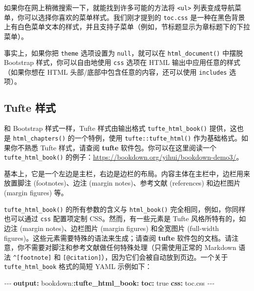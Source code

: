 \documentclass[
  12pt,
]{krantz}
\newenvironment{Shaded}{\begin{snugshade}}{\end{snugshade}}
\newcommand{\AttributeTok}[1]{\textcolor[rgb]{0.13,0.29,0.53}{#1}}
\newcommand{\CharTok}[1]{\textcolor[rgb]{0.31,0.60,0.02}{#1}}
\newcommand{\FunctionTok}[1]{\textcolor[rgb]{0.13,0.29,0.53}{\textbf{#1}}}
\newcommand{\KeywordTok}[1]{\textcolor[rgb]{0.13,0.29,0.53}{\textbf{#1}}}
\newcommand{\PreprocessorTok}[1]{\textcolor[rgb]{0.56,0.35,0.01}{\textit{#1}}}
\theoremstyle{definition}
\theoremstyle{definition}
\theoremstyle{definition}
\theoremstyle{definition}
\theoremstyle{remark}
\begin{document}
如果你在网上稍微搜索一下，就能找到许多可能的方法将 \texttt{\textless{}ul\textgreater{}} 列表变成导航菜单，你可以选择你喜欢的菜单样式。我们刚才提到的 \texttt{toc.css} 是一种在黑色背景上有白色菜单文本的样式，并且支持子菜单（例如，节标题显示为章标题下的下拉菜单）。

事实上，如果你把 \texttt{theme} 选项设置为 \texttt{null}，就可以在 \texttt{html\_document()} 中摆脱 Bootstrap 样式，你可以自由地使用 \texttt{css} 选项在 HTML 输出中应用任意的样式（如果你想在 HTML 头部/底部中包含任意的内容，还可以使用 \texttt{includes} 选项）。

\hypertarget{tufte-style}{%
\subsection{Tufte 样式}\label{tufte-style}}

和 Bootstrap 样式一样，Tufte 样式由输出格式 \texttt{tufte\_html\_book()} 提供，这也是 \texttt{html\_chapters()} 的一个特例，使用 \texttt{tufte::tufte\_html()} 作为基础格式。如果你不熟悉 Tufte 样式，请查阅 \textbf{tufte} 软件包\citep{R-tufte}。你可以在这里阅读一个 \texttt{tufte\_html\_book()} 的例子：\url{https://bookdown.org/yihui/bookdown-demo3/}。

基本上，它是一个左边是主栏，右边是边栏的布局。内容主体在主栏中，边栏用来放置脚注 (footnotes)、边注 (margin notes)、参考文献 (references) 和边栏图片 (margin figures) 等。

\texttt{tufte\_html\_book()} 的所有参数的含义与 \texttt{html\_book()} 完全相同，例如，你同样也可以通过 \texttt{css} 配置项定制 CSS。然而，有一些元素是 Tufte 风格所特有的，如边注 (margin notes)、边栏图片 (margin figures) 和全宽图片 (full-width figures)。这些元素需要特殊的语法来生成；请查阅 \textbf{tufte} 软件包的文档。请注意，你不需要对脚注和参考文献做任何特殊处理（只需使用正常的 Markdown 语法 \texttt{\^{}{[}footnote{]}} 和 \texttt{{[}@citation{]}}），因为它们会被自动放到页边。一个关于 \texttt{tufte\_html\_book} 格式的简短 YAML 示例如下：

\begin{Shaded}
\begin{Highlighting}[]
\PreprocessorTok{{-}{-}{-}}
\FunctionTok{output}\KeywordTok{:}
\AttributeTok{  bookdown:}\FunctionTok{:tufte\_html\_book}\KeywordTok{:}
\AttributeTok{    }\FunctionTok{toc}\KeywordTok{:}\AttributeTok{ }\CharTok{true}
\AttributeTok{    }\FunctionTok{css}\KeywordTok{:}\AttributeTok{ toc.css}
\PreprocessorTok{{-}{-}{-}}
\end{Highlighting}
\end{Shaded}
\end{document}
